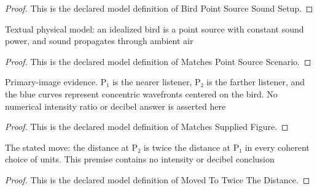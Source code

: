 \begin{proof}
  This is the declared model definition of Bird Point Source Sound Setup.
\end{proof}
\begin{definition}
  \label{def:physics:phyx-mini-0191:phyxminiproblems-problemphyxmini0191-matchespointsourcescenario}
  Textual physical model: an idealized bird is a point source with constant sound power, and sound propagates through ambient air
\end{definition}
\begin{proof}
  This is the declared model definition of Matches Point Source Scenario.
\end{proof}
\begin{definition}
  \label{def:physics:phyx-mini-0191:phyxminiproblems-problemphyxmini0191-matchessuppliedfigure}
  Primary-image evidence. P₁ is the nearer listener, P₂ is the farther listener, and the blue curves represent concentric wavefronts centered on the bird. No numerical intensity ratio or decibel answer is asserted here
\end{definition}
\begin{proof}
  This is the declared model definition of Matches Supplied Figure.
\end{proof}
\begin{definition}
  \label{def:physics:phyx-mini-0191:phyxminiproblems-problemphyxmini0191-movedtotwicethedistance}
  The stated move: the distance at P₂ is twice the distance at P₁ in every coherent choice of units. This premise contains no intensity or decibel conclusion
\end{definition}
\begin{proof}
  This is the declared model definition of Moved To Twice The Distance.
\end{proof}
